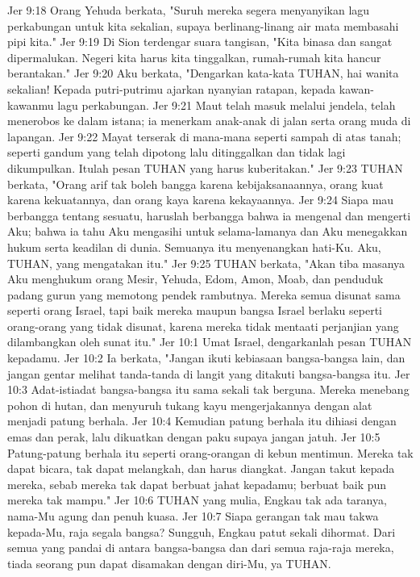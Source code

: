 Jer 9:18  Orang Yehuda berkata, "Suruh mereka segera menyanyikan lagu perkabungan untuk kita sekalian, supaya berlinang-linang air mata membasahi pipi kita."
Jer 9:19  Di Sion terdengar suara tangisan, "Kita binasa dan sangat dipermalukan. Negeri kita harus kita tinggalkan, rumah-rumah kita hancur berantakan."
Jer 9:20  Aku berkata, "Dengarkan kata-kata TUHAN, hai wanita sekalian! Kepada putri-putrimu ajarkan nyanyian ratapan, kepada kawan-kawanmu lagu perkabungan.
Jer 9:21  Maut telah masuk melalui jendela, telah menerobos ke dalam istana; ia menerkam anak-anak di jalan serta orang muda di lapangan.
Jer 9:22  Mayat terserak di mana-mana seperti sampah di atas tanah; seperti gandum yang telah dipotong lalu ditinggalkan dan tidak lagi dikumpulkan. Itulah pesan TUHAN yang harus kuberitakan."
Jer 9:23  TUHAN berkata, "Orang arif tak boleh bangga karena kebijaksanaannya, orang kuat karena kekuatannya, dan orang kaya karena kekayaannya.
Jer 9:24  Siapa mau berbangga tentang sesuatu, haruslah berbangga bahwa ia mengenal dan mengerti Aku; bahwa ia tahu Aku mengasihi untuk selama-lamanya dan Aku menegakkan hukum serta keadilan di dunia. Semuanya itu menyenangkan hati-Ku. Aku, TUHAN, yang mengatakan itu."
Jer 9:25  TUHAN berkata, "Akan tiba masanya Aku menghukum orang Mesir, Yehuda, Edom, Amon, Moab, dan penduduk padang gurun yang memotong pendek rambutnya. Mereka semua disunat sama seperti orang Israel, tapi baik mereka maupun bangsa Israel berlaku seperti orang-orang yang tidak disunat, karena mereka tidak mentaati perjanjian yang dilambangkan oleh sunat itu."
Jer 10:1  Umat Israel, dengarkanlah pesan TUHAN kepadamu.
Jer 10:2  Ia berkata, "Jangan ikuti kebiasaan bangsa-bangsa lain, dan jangan gentar melihat tanda-tanda di langit yang ditakuti bangsa-bangsa itu.
Jer 10:3  Adat-istiadat bangsa-bangsa itu sama sekali tak berguna. Mereka menebang pohon di hutan, dan menyuruh tukang kayu mengerjakannya dengan alat menjadi patung berhala.
Jer 10:4  Kemudian patung berhala itu dihiasi dengan emas dan perak, lalu dikuatkan dengan paku supaya jangan jatuh.
Jer 10:5  Patung-patung berhala itu seperti orang-orangan di kebun mentimun. Mereka tak dapat bicara, tak dapat melangkah, dan harus diangkat. Jangan takut kepada mereka, sebab mereka tak dapat berbuat jahat kepadamu; berbuat baik pun mereka tak mampu."
Jer 10:6  TUHAN yang mulia, Engkau tak ada taranya, nama-Mu agung dan penuh kuasa.
Jer 10:7  Siapa gerangan tak mau takwa kepada-Mu, raja segala bangsa? Sungguh, Engkau patut sekali dihormat. Dari semua yang pandai di antara bangsa-bangsa dan dari semua raja-raja mereka, tiada seorang pun dapat disamakan dengan diri-Mu, ya TUHAN.
